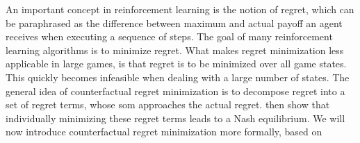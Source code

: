 \documentclass[10pt,a4paper]{article}
\begin{document}
An important concept in reinforcement learning is the notion of regret, which can be paraphrased as the difference between maximum and actual payoff an agent receives when executing a sequence of steps. The goal of many reinforcement learning algorithms is to minimize regret. What makes regret minimization less applicable in large games, is that regret is to be minimized over all game states. This quickly becomes infeasible when dealing with a large number of states. The general idea of counterfactual regret minimization is to decompose regret into a set of regret terms, whose som approaches the actual regret. \citeauthor{cfr} then show that individually minimizing these regret terms leads to a Nash equilibrium. We will now introduce counterfactual regret minimization more formally, based on \citep{cfr_for_beginners}\\
\end{document}
